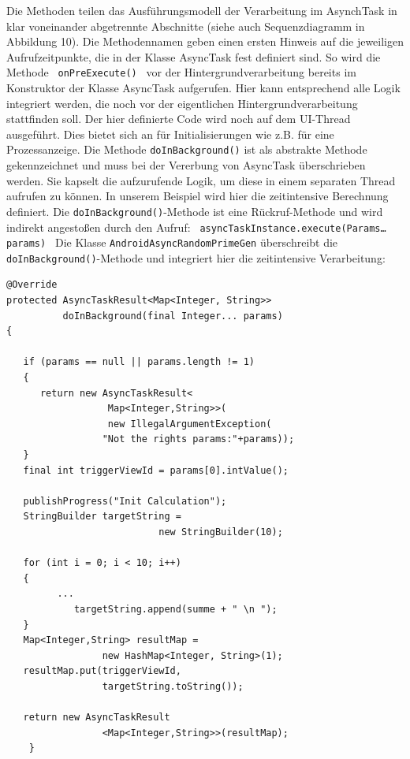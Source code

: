 \documentclass[12pt,oneside,a4paper,bibtotoc,liststotoc]{scrreprt}
\begin{document}
Die Methoden teilen das Ausführungsmodell der Verarbeitung im AsynchTask in klar voneinander abgetrennte Abschnitte (siehe auch Sequenzdiagramm in Abbildung 10). Die Methodennamen geben einen ersten Hinweis auf die jeweiligen Aufrufzeitpunkte, die in der Klasse AsyncTask fest definiert sind. So wird die Methode\newline 
\texttt{\newline
onPreExecute()\newline
}\newline
vor der Hintergrundverarbeitung bereits im Konstruktor der Klasse AsyncTask aufgerufen. Hier kann entsprechend alle Logik integriert werden, die noch vor der eigentlichen Hintergrundverarbeitung stattfinden soll. Der hier definierte Code wird noch auf dem UI-Thread ausgeführt. Dies bietet sich an für Initialisierungen wie z.B. für eine Prozessanzeige.\newline
Die Methode\newline \newline
\texttt{doInBackground()}\newline\newline
ist als abstrakte Methode gekennzeichnet und muss bei der Vererbung von AsyncTask überschrieben werden. Sie kapselt die aufzurufende Logik, um diese in einem separaten Thread aufrufen zu können. In unserem Beispiel wird hier die zeitintensive Berechnung definiert. Die \texttt{doInBackground()}-Methode ist eine Rückruf-Methode und wird indirekt angestoßen durch den Aufruf:\newline 
\texttt{\newline
asyncTaskInstance.execute(Params…params)\newline
}\newline
Die Klasse \texttt{AndroidAsyncRandomPrimeGen} überschreibt die \texttt{doInBackground()}-Methode und integriert hier die zeitintensive Verarbeitung:\newline
\begin{lstlisting}
@Override
protected AsyncTaskResult<Map<Integer, String>> 
          doInBackground(final Integer... params)
{

   if (params == null || params.length != 1)
   {
      return new AsyncTaskResult<
                  Map<Integer,String>>(
                  new IllegalArgumentException(
                 "Not the rights params:"+params));
   }
   final int triggerViewId = params[0].intValue();

   publishProgress("Init Calculation");
   StringBuilder targetString = 
                           new StringBuilder(10);

   for (int i = 0; i < 10; i++)
   {      
         ...
            targetString.append(summe + " \n ");
   }
   Map<Integer,String> resultMap = 
                 new HashMap<Integer, String>(1);
   resultMap.put(triggerViewId, 
                 targetString.toString());
                 
   return new AsyncTaskResult
                 <Map<Integer,String>>(resultMap);
    }
\end{lstlisting}
\end{document}

